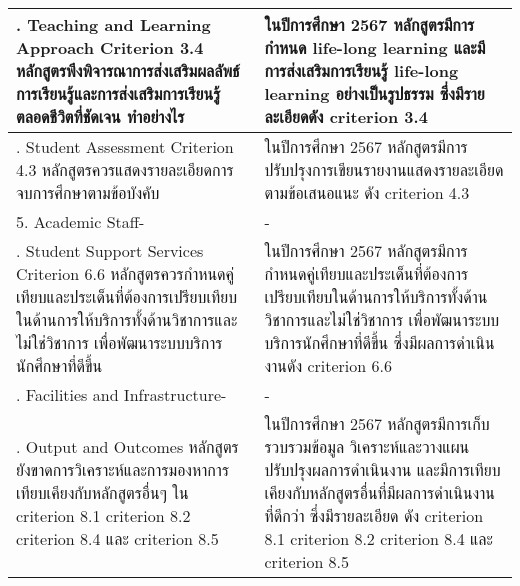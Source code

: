 \begin{longtable}{|>{\raggedcolumns}p{}|>{\raggedcolumns}p{}|}
	3. Teaching and Learning Approach
\newline
Criterion 3.4 \newline
หลักสูตรพึงพิจารณาการส่งเสริมผลลัพธ์การเรียนรู้และการส่งเสริมการเรียนรู้ตลอดชีวิตที่ชัดเจน ทำอย่างไร
&ในปีการศึกษา 2567 หลักสูตรมีการกำหนด life-long learning และมีการส่งเสริมการเรียนรู้ life-long learning อย่างเป็นรูปธรรม ซึ่งมีรายละเอียดดัง criterion 3.4  \\\hline

4. Student Assessment\newline
Criterion 4.3\newline
หลักสูตรควรแสดงรายละเอียดการจบการศึกษาตามข้อบังคับ
&ในปีการศึกษา 2567 หลักสูตรมีการปรับปรุงการเขียนรายงานแสดงรายละเอียดตามข้อเสนอแนะ ดัง criterion 4.3\\\hline

5. Academic Staff\newline-&-\\\hline
6. Student Support Services\newline
Criterion 6.6\newline
หลักสูตรควรกำหนดคู่เทียบและประเด็นที่ต้องการเปรียบเทียบในด้านการให้บริการทั้งด้านวิชาการและไม่ใช่วิชาการ เพื่อพัฒนาระบบบริการนักศึกษาที่ดีขึ้น
& ในปีการศึกษา 2567 หลักสูตรมีการกำหนดคู่เทียบและประเด็นที่ต้องการเปรียบเทียบในด้านการให้บริการทั้งด้านวิชาการและไม่ใช่วิชาการ เพื่อพัฒนาระบบบริการนักศึกษาที่ดีขึ้น ซึ่งมีผลการดำเนินงานดัง criterion 6.6\\\hline
7. Facilities and Infrastructure\newline-&-\\\hline
8. Output and Outcomes\newline
หลักสูตรยังขาดการวิเคราะห์และการมองหาการเทียบเคียงกับหลักสูตรอื่นๆ ใน criterion 8.1 criterion 8.2 criterion 8.4 และ criterion 8.5
&ในปีการศึกษา 2567 หลักสูตรมีการเก็บรวบรวมข้อมูล วิเคราะห์และวางแผนปรับปรุงผลการดำเนินงาน และมีการเทียบเคียงกับหลักสูตรอื่นที่มีผลการดำเนินงานที่ดีกว่า ซึ่งมีรายละเอียด ดัง criterion 8.1 criterion 8.2 criterion 8.4 และ criterion 8.5\\\hline
	 \end{longtable}





